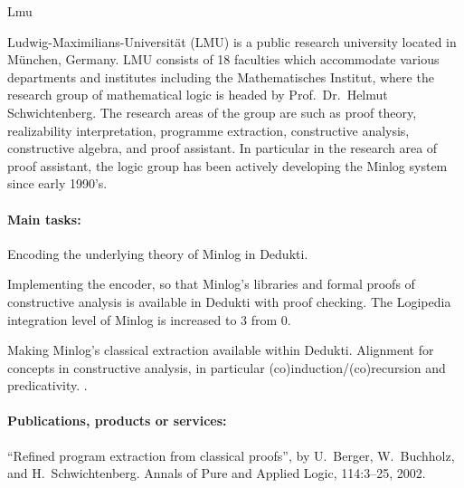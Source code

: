 \begin{sitedescription}{Lmu}

\newcommand\inquotes[1]{``#1''}


Ludwig-Maximilians-Universit\"at (LMU) is a public research university
located in M\"unchen, Germany.  LMU consists of 18 faculties which
accommodate various departments and institutes including the
Mathematisches Institut, where the research group of mathematical
logic is headed by Prof.\ Dr.\ Helmut Schwichtenberg.  The research
areas of the group are such as proof theory, realizability
interpretation, programme extraction, constructive analysis,
constructive algebra, and proof assistant.  In particular in the
research area of proof assistant, the logic group has been actively
developing the Minlog system since early 1990's.

\paragraph*{Main tasks:}

\begin{compactitem}
  \item Encoding the underlying theory of Minlog in Dedukti.  
  \item Implementing the encoder, so that Minlog's libraries and formal proofs of constructive analysis is available in Dedukti with proof checking.
The Logipedia integration level of Minlog is increased to 3 from 0.  
  \item Making Minlog's classical extraction available within Dedukti.  Alignment for concepts in constructive analysis, in particular (co)induction/(co)recursion and predicativity.  .  

\end{compactitem}

\paragraph*{Publications, products or services:}

\begin{compactitem}
\item ``Refined program extraction from classical proofs'',
  by U.~Berger, W.~Buchholz, and H.~Schwichtenberg.
  Annals of Pure and Applied Logic, 114:3--25, 2002.


\end{compactitem}
\end{sitedescription}
